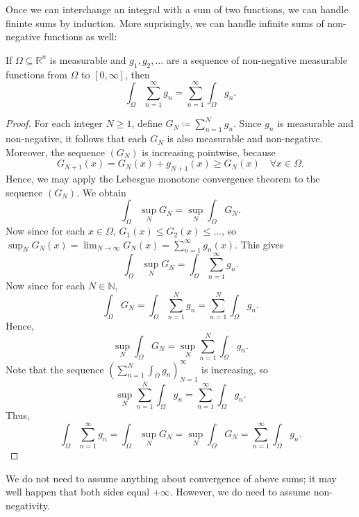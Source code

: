 Once we can interchange an integral with a sum of two functions, we can handle fininte sums by induction. More suprisingly, we can handle infinite sums of non-negative functions as well:

\begin{corollary} \label{cl: int and countable sum can interchange}
    If \(\Omega \subseteq \mathbb{R} ^n\) is measurable and \(g_1, g_2, \dots \) are a sequence of non-negative measurable functions from \(\Omega\) to \([0, \infty]\), then 
    \[
        \int _\Omega \sum_{n=1}^{\infty} g_n = \sum_{n=1}^{\infty} \int _\Omega g_n.  
    \]    
\end{corollary}

\begin{proof}
    For each integer \(N \ge 1\), define \(G_N \coloneqq \sum_{n=1}^N g_n \). Since \(g_n\) is measurable and non-negative, it follows that each \(G_N\) is also measurable and non-negative. Moreover, the sequence \((G_N)\) is increasing pointwise, because 
    \[
        G_{N+1}(x) = G_N(x) + g_{N+1}(x) \ge G_N(x) \quad \forall x \in \Omega.
    \]     
    Hence, we may apply the Lebesgue monotone convergence theorem to the sequence \(\left( G_N \right) \). We obtain 
    \[
        \int _\Omega \sup _N G_N = \sup _N \int _\Omega G_N.
    \] 
    Now since for each \(x \in \Omega\), \(G_1(x) \le G_2(x) \le \dots \), so \(\sup _N G_N(x) = \lim_{N \to \infty} G_N(x) = \sum_{n=1}^{\infty} g_n(x)  \). This gives
    \[
        \int _\Omega \sup _N G_N = \int _\Omega \sum_{n=1}^{\infty} g_n. 
    \]  
    Now since for each \(N \in \mathbb{N}\),
    \[
        \int _\Omega G_N = \int _\Omega \sum_{n=1}^N g_n = \sum_{n=1}^N \int _\Omega g_n.  
    \] 
    Hence,
    \[
        \sup _N \int _\Omega G_N = \sup _N \sum_{n=1}^N \int _\Omega g_n. 
    \]
    Note that the sequence \(\left( \sum_{n=1}^N \int _\Omega g_n  \right)_{N=1}^{\infty} \) is increasing, so 
    \[
        \sup _N \sum_{n=1}^N \int _\Omega g_n = \sum_{n=1}^{\infty} \int _\Omega g_n.  
    \] 
    Thus,
    \[
        \int _\Omega \sum_{n=1}^{\infty} g_n = \int _\Omega \sup _N G_N = \sup _N \int _\Omega G_N = \sum_{n=1}^{\infty} \int _\Omega g_n. 
    \]
\end{proof}

\begin{remark}
    We do not need to assume anything about convergence of above sums; it may well happen that both sides equal \(+\infty\). However, we do need to assume non-negativity.  
\end{remark}

